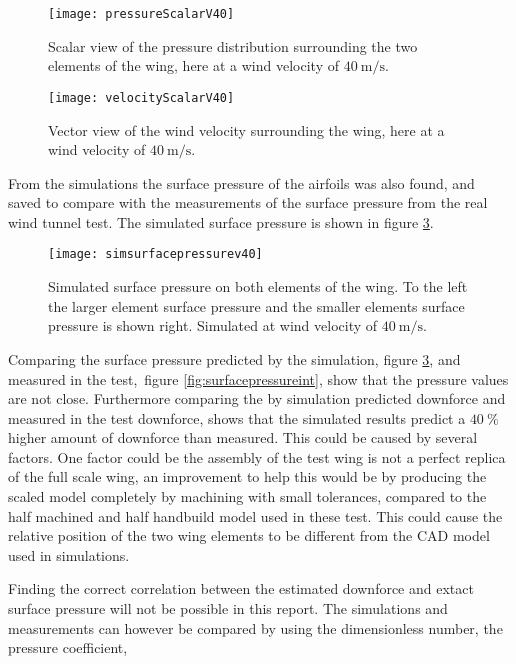   \begin{figure}
    \texttt{[image: pressureScalarV40]}
    \caption{Scalar view of the pressure distribution surrounding the two elements of the wing, here at a wind velocity of $\SI{40}{\metre\per\second}$.}
    \label{fig:pressureScalarV40}
  \end{figure}

  \begin{figure}
    \texttt{[image: velocityScalarV40]}
    \caption{Vector view of the wind velocity surrounding the wing, here at a wind velocity of $\SI{40}{\metre\per\second}$.}
    \label{fig:velocityScalarV40}
  \end{figure}

  From the simulations the surface pressure of the airfoils was also found, and saved to compare with the measurements of the surface pressure from the real wind tunnel test. The simulated surface pressure is shown in figure \ref{fig:simsurfacepressurev40}.

  \begin{figure}
    \texttt{[image: simsurfacepressurev40]}
    \caption{Simulated surface pressure on both elements of the wing. To the left the larger element surface pressure and the smaller elements surface pressure is shown right. Simulated at wind velocity of $\SI{40}{\metre\per\second}$.}
    \label{fig:simsurfacepressurev40}
  \end{figure}

  Comparing the surface pressure predicted by the simulation, figure \ref{fig:simsurfacepressurev40}, and measured in the test, figure \ref{fig:surfacepressureint}, show that the pressure values are not close. Furthermore comparing the by simulation predicted downforce and measured in the test downforce, shows that the simulated results predict a $\SI{40}{\%}$ higher amount of downforce than measured. This could be caused by several factors. One factor could be the assembly of the test wing is not a perfect replica of the full scale wing, an improvement to help this would be by producing the scaled model completely by machining with small tolerances, compared to the half machined and half handbuild model used in these test. This could cause the relative position of the two wing elements to be different from the CAD model used in simulations.

  Finding the correct correlation between the estimated downforce and extact surface pressure will not be possible in this report. The simulations and measurements can however be compared by using the dimensionless number, the pressure coefficient,

